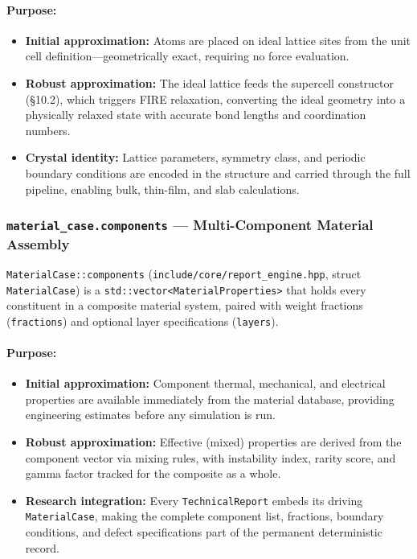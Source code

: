 \documentclass[11pt]{article}
\begin{document}
\paragraph{Purpose:}
\begin{itemize}
  \item \textbf{Initial approximation:} Atoms are placed on ideal
        lattice sites from the unit cell definition---geometrically
        exact, requiring no force evaluation.
  \item \textbf{Robust approximation:} The ideal lattice feeds the
        supercell constructor (\S{}10.2), which triggers FIRE relaxation,
        converting the ideal geometry into a physically relaxed state
        with accurate bond lengths and coordination numbers.
  \item \textbf{Crystal identity:} Lattice parameters, symmetry class,
        and periodic boundary conditions are encoded in the structure
        and carried through the full pipeline, enabling bulk, thin-film,
        and slab calculations.
\end{itemize}

\subsubsection{\texttt{material\_case.components} --- Multi-Component Material Assembly}

\texttt{MaterialCase::components}
(\texttt{include/core/report\_engine.hpp}, struct \texttt{MaterialCase})
is a \texttt{std::vector<MaterialProperties>} that holds every constituent
in a composite material system, paired with weight fractions
(\texttt{fractions}) and optional layer specifications (\texttt{layers}).

\paragraph{Purpose:}
\begin{itemize}
  \item \textbf{Initial approximation:} Component thermal, mechanical,
        and electrical properties are available immediately from the
        material database, providing engineering estimates before any
        simulation is run.
  \item \textbf{Robust approximation:} Effective (mixed) properties are
        derived from the component vector via mixing rules, with
        instability index, rarity score, and gamma factor tracked for
        the composite as a whole.
  \item \textbf{Research integration:} Every \texttt{TechnicalReport}
        embeds its driving \texttt{MaterialCase}, making the complete
        component list, fractions, boundary conditions, and defect
        specifications part of the permanent deterministic record.
\end{itemize}
\end{document}
